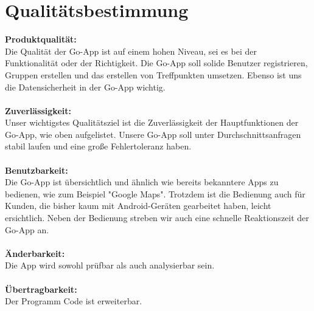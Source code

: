 \section{Qualitätsbestimmung}
\textbf{Produktqualität:}\\ %
Die Qualität der Go-App ist auf einem hohen Niveau, sei es bei der Funktionalität oder der Richtigkeit. Die Go-App soll solide Benutzer registrieren, Gruppen erstellen und das erstellen von Treffpunkten umsetzen. Ebenso ist uns die Datensicherheit in der Go-App wichtig.\\ \\
\textbf{Zuverlässigkeit:}\\%
Unser wichtigstes Qualitätsziel ist die Zuverlässigkeit der Hauptfunktionen der Go-App, wie oben aufgelistet. Unsere Go-App soll unter Durchschnittsanfragen stabil laufen und eine große Fehlertoleranz haben. \\ \\
\textbf{Benutzbarkeit:}\\ %
Die Go-App ist übersichtlich und ähnlich wie bereits bekanntere Apps zu bedienen, wie zum Beispiel "Google Maps". Trotzdem ist die Bedienung auch für Kunden, die bisher kaum mit Android-Geräten gearbeitet haben, leicht ersichtlich. Neben der Bedienung streben wir auch eine schnelle Reaktionszeit der Go-App an.\\ \\
\textbf{Änderbarkeit:}\\ %
Die App wird sowohl prüfbar als auch analysierbar sein. \\ \\
\textbf{Übertragbarkeit:}\\%
Der Programm Code ist erweiterbar.\\